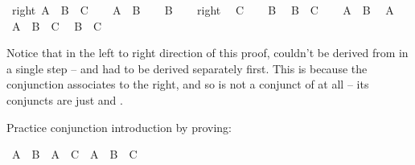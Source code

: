 \begin{isabellebody}
\ right{\isacharcolon}\ {\isachardoublequoteopen}{\isacharparenleft}A\ {\isasymand}\ B{\isacharparenright}\ {\isasymand}\ C{\isachardoublequoteclose}\isanewline
\ \ \isamarkupfalse%
\ {\isachardoublequoteopen}A\ {\isasymand}\ B{\isachardoublequoteclose}\isacommand{{\isachardot}{\isachardot}}\isamarkupfalse%
\isanewline
\ \ \isamarkupfalse%
\ {\isachardoublequoteopen}B{\isachardoublequoteclose}\isacommand{{\isachardot}{\isachardot}}\isamarkupfalse%
\isanewline
\ \ \isamarkupfalse%
\ right\ \isamarkupfalse%
\ {\isachardoublequoteopen}C{\isachardoublequoteclose}\isacommand{{\isachardot}{\isachardot}}\isamarkupfalse%
\isanewline
\ \ \isamarkupfalse%
\ {\isacharbackquoteopen}B{\isacharbackquoteclose}\ \isamarkupfalse%
\ {\isachardoublequoteopen}B\ {\isasymand}\ C{\isachardoublequoteclose}\isacommand{{\isachardot}{\isachardot}}\isamarkupfalse%
\isanewline
\ \ \isamarkupfalse%
\ {\isacharbackquoteopen}A\ {\isasymand}\ B{\isacharbackquoteclose}\ \isamarkupfalse%
\ {\isachardoublequoteopen}A{\isachardoublequoteclose}\isacommand{{\isachardot}{\isachardot}}\isamarkupfalse%
\isanewline
\ \ \isamarkupfalse%
\ {\isachardoublequoteopen}A\ {\isasymand}\ B\ {\isasymand}\ C{\isachardoublequoteclose}\ \isamarkupfalse%
\ {\isacharbackquoteopen}B\ {\isasymand}\ C{\isacharbackquoteclose}\isacommand{{\isachardot}{\isachardot}}\isamarkupfalse%
\isanewline
{}\isamarkupfalse%
%
\endisatagproof
{\isafoldproof}%
%
\isadelimproof
%
\endisadelimproof
%
\begin{isamarkuptext}%
Notice that in the left to right direction of this proof,  couldn't be derived
from  in a single step --  and  had to be derived separately
first. This is because the conjunction associates to the right, and so  is not a conjunct
of  at all -- its conjuncts are just  and .%
\end{isamarkuptext}\isamarkuptrue%
%
\begin{isamarkuptext}%
\begin{Exercise} Practice conjunction introduction by proving: \end{Exercise}%
\end{isamarkuptext}\isamarkuptrue%
\isamarkupfalse%
\ {\isachardoublequoteopen}{\isacharparenleft}A\ {\isasymlongrightarrow}\ B{\isacharparenright}\ {\isasymlongrightarrow}\ {\isacharparenleft}A\ {\isasymlongrightarrow}\ C{\isacharparenright}\ {\isasymlongrightarrow}\ A\ {\isasymlongrightarrow}\ B\ {\isasymand}\ C{\isachardoublequoteclose}%

\end{isabellebody}
